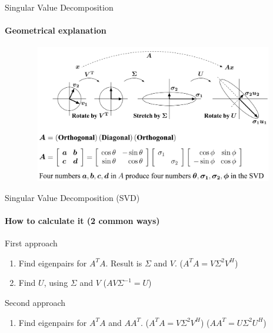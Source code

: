 \documentclass[aspectratio=169]{beamer}
\begin{document}
\begin{frame}[t]{Singular Value Decomposition}
\framesubtitle{Geometrical explanation}
    \vspace{-0.5cm}
    \begin{figure}[H]
        \centering\includegraphics[height=6cm,width=1\textwidth,keepaspectratio]{svd_geometry.png}
        \label{fig:svd_geometry.png}
    \end{figure}
\end{frame}

\begin{frame}[t]{Singular Value Decomposition (SVD)}
\framesubtitle{How to calculate it (2 common ways)}
    \begin{block}{First approach}
        \begin{enumerate}
            \item Find eigenpairs for $A^TA$. Result is $\Sigma$ and $V$. ($A^TA=V\Sigma^{2}V^H$)
            \item Find $U$, using $\Sigma$ and $V$ ($AV\Sigma^{-1} = U$)
        \end{enumerate}
    \end{block}
    \begin{block}{Second approach}
        \begin{enumerate}
            \item Find eigenpairs for $A^TA$ and $AA^T$. ($A^TA=V\Sigma^{2}V^H$) ($AA^T=U\Sigma^{2}U^H$)
        \end{enumerate}
    \end{block}
\end{frame}
\end{document}
